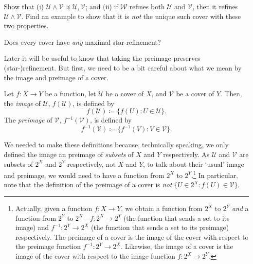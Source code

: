 \begin{exr}
Show that (i) $\mathcal{U}\wedge \mathcal{V}\preceq \mathcal{U},\mathcal{V}$; and (ii) if $\mathcal{W}$ refines both $\mathcal{U}$ and $\mathcal{V}$, then it refines $\mathcal{U}\wedge \mathcal{V}$.  Find an example to show that it is \emph{not} the unique such cover with these two properties.
\end{exr}
\begin{exr}
Does every cover have \emph{any} maximal star-refinement?
\end{exr}

Later it will be useful to know that taking the preimage preserves (star-)refinement.  But first, we need to be a bit careful about what we mean by the image and preimage of a cover.
\begin{dfn}
Let $f:X\rightarrow Y$ be a function, let $\mathcal{U}$ be a cover of $X$, and $\mathcal{V}$ be a cover of $Y$.  Then, the \emph{image} of $\mathcal{U}$, $f(\mathcal{U})$, is defined by
\begin{equation}
f(\mathcal{U})\coloneqq \{ f(U):U\in \mathcal{U}\} .
\end{equation}
The \emph{preimage} of $\mathcal{V}$, $f^{-1}(\mathcal{V})$, is defined by
\begin{equation}
f^{-1}(\mathcal{V})\coloneqq \{ f^{-1}(V):V\in \mathcal{V}\} .
\end{equation}
\begin{rmk}
We needed to make these definitions because, technically speaking, we only defined the image an preimage of \emph{subsets} of $X$ and $Y$ respectively.  As $\mathcal{U}$ and $\mathcal{V}$ are subsets of $2^X$ and $2^Y$ respectively, not $X$ and $Y$, to talk about their `usual' image and preimage, we would need to have a function from $2^X$ to $2^Y$.\footnote{Actually, given a function $f:X\rightarrow Y$, we obtain a function from $2^X$ to $2^Y$ \emph{and} a function from $2^Y$ to $2^X$---$f:2^X\rightarrow 2^Y$ (the function that sends a set to its image) and $f^{-1}:2^Y\rightarrow 2^X$ (the function that sends a set to its preimage) respectively.  The preimage of a cover is the image of the cover with respect to the preimage function $f^{-1}:2^Y\rightarrow 2^X$.  Likewise, the image of a cover is the image of the cover with respect to the image function $f:2^X\rightarrow 2^Y$.}  In particular, note that the definition of the preimage of a cover is \emph{not} $\{ U\in 2^X:f(U)\in \mathcal{V}\}$.
\end{rmk}
\end{dfn}
